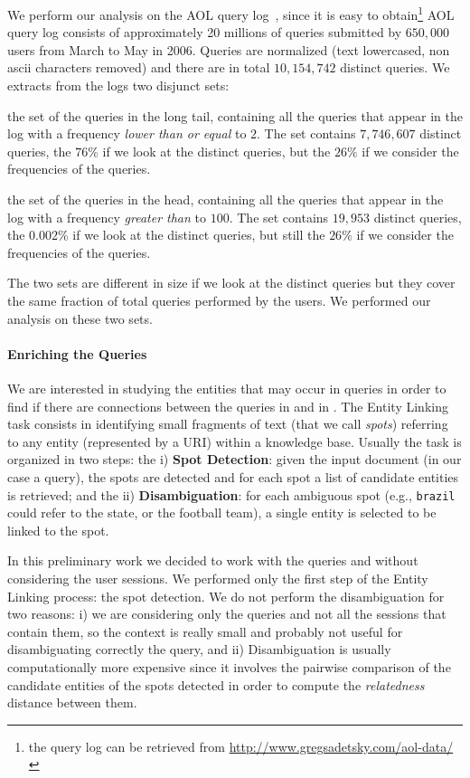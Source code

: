 We perform our analysis on the AOL query log~\cite{pass2006picture}, since it is easy to obtain\footnote{the query log can be retrieved from \url{http://www.gregsadetsky.com/aol-data/}}
AOL query log consists of approximately 20 millions of queries submitted by $650,000$ users from March to May in 2006. Queries are normalized (text lowercased, non ascii characters removed) and 
there are in total $10,154,742$ distinct queries. We extracts from the logs two disjunct sets: 
\begin{description}
	\item{\tail{}} the set of the queries in the long tail, containing all the queries that appear in the log with a frequency \emph{lower than or equal} to $2$. The set contains 
	$7,746,607$ distinct queries, the $76\%$ if we look at the distinct queries, but the $26\%$ if we consider the frequencies of the queries.
	\item{\head{}} the set of the queries in the head, containing all the queries that appear in the log with a frequency \emph{greater than} to $100$. The set contains 
	$19,953$ distinct queries, the $0.002\%$ if we look at the distinct queries, but still the $26\%$ if we consider the frequencies of the queries.
\end{description}
The two sets are different in size if we look at the distinct queries but they cover the same fraction of total queries performed by the users. We performed our 
analysis on these two sets.

\paragraph{Enriching the Queries}
We are interested in studying the entities that may occur in queries in order to find if there are connections between the queries in \head{} and in \tail{}.
The Entity Linking task consists in identifying  small fragments of text (that we call \emph{spots}) referring to any entity (represented by a URI) 
within a knowledge base. Usually the task is organized in two steps: the i) \textbf{Spot Detection}: given the input document (in our case a query), 
the spots are detected and for each spot a list of candidate entities is retrieved; and the ii) \textbf{Disambiguation}:
for each ambiguous spot (e.g., \texttt{brazil} could refer to the state, or the football team), a single  entity is 
selected  to be linked to the spot.

In this preliminary work we decided to work with the queries and without considering the user sessions. We performed only the first step of the Entity Linking 
process: the spot detection. We do not perform the disambiguation for two reasons: i) we are considering only the queries and not all the sessions that contain 
them, so the context is really small and probably not useful for disambiguating correctly the query, and ii) Disambiguation is usually computationally more expensive
since it involves the pairwise comparison of the candidate entities of the spots
detected in order to compute the \emph{relatedness}\cite{milne2008learning} distance between them.

